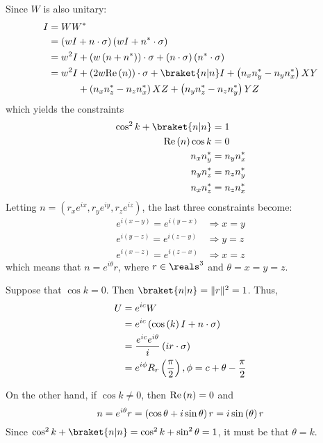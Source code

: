 \begin{enumerate}
%
Since $W$ is also unitary:
%
\begin{align}
I &= W W^* \\
&= \left( w I + n \cdot \sigma \right) \left( w I + n^* \cdot \sigma \right) \\
&= w^2 I + \left( w \left( n + n^* \right) \right) \cdot \sigma + \left( n \cdot \sigma \right) \left( n^* \cdot \sigma \right) \\
&= w^2 I + \left( 2 w \re{n} \right) \cdot \sigma + \braket{n|n} I +\left( n_x n_y^* - n_y n_x^* \right) XY \notag \\
&\phantom{{}= w^2 I} + \left( n_x n_z^* - n_z n_x^* \right) XZ + \left( n_y n_z^* - n_z n_y^* \right) YZ
\end{align}
%
which yields the constraints
%
\begin{align}
\cos^2 k + \braket{n|n} &= 1 \\
\re{n} \cos k &= 0 \\
n_x n_y^* &= n_y n_x^* \\
n_y n_z^* &= n_z n_y^* \\
n_x n_z^* &= n_z n_x^*
\end{align}
%
Letting $n = \left( r_x e^{ix}, r_y e^{iy}, r_z e^{iz} \right)$, the last three constraints become:
%
\begin{align}
e^{i \left( x - y \right)} = e^{i \left( y - x \right)} &\Rightarrow x = y \\
e^{i \left( y - z \right)} = e^{i \left( z - y \right)} &\Rightarrow y = z \\
e^{i \left( x - z \right)} = e^{i \left( z - x \right)} &\Rightarrow x = z
\end{align}
%
which means that $n = e^{i \theta} r$, where $r \in \reals^3$ and $\theta = x = y = z$.
%
\par Suppose that $\cos k = 0$.
%
Then $\braket{n|n} = \lVert r \rVert ^2 = 1$.
%
Thus,
%
\begin{align}
U &= e^{ic} W \\
&= e^{ic} \left( \cos \left( k \right) I + n \cdot \sigma \right) \\
&= \frac{e^{ic} e^{i \theta}}{i} \left( i r \cdot \sigma \right) \\
&= e^{i \phi} R_r \left( \frac{\pi}{2} \right), \phi = c + \theta - \frac{\pi}{2}
\end{align}
%
\par On the other hand, if $\cos k \ne 0$, then $\mathrm{Re} \left( n \right) = 0$ and
$$
n = e^{i \theta} r = \left( \cos \theta + i \sin \theta \right) r = i \sin \left( \theta \right) r
$$
%
Since $\cos^2 k + \braket{n|n} = \cos^2 k + \sin^2 \theta = 1$, it must be that $\theta = k$.

\end{enumerate}
